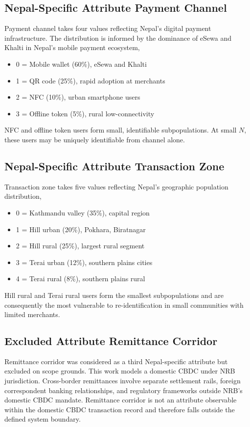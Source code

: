 \subsection{Nepal-Specific Attribute Payment Channel}
Payment channel takes four values reflecting Nepal's digital
payment infrastructure. The distribution is informed by the
dominance of eSewa and Khalti in Nepal's mobile payment
ecosystem,

\begin{itemize}
    \item 0 = Mobile wallet (60\%), eSewa and Khalti
    \item 1 = QR code (25\%), rapid adoption at merchants
    \item 2 = NFC (10\%), urban smartphone users
    \item 3 = Offline token (5\%), rural low-connectivity
\end{itemize}

NFC and offline token users form small, identifiable
subpopulations. At small $N$, these users may be uniquely
identifiable from channel alone.

\subsection{Nepal-Specific Attribute Transaction Zone}
Transaction zone takes five values reflecting Nepal's
geographic population distribution,

\begin{itemize}
    \item 0 = Kathmandu valley (35\%), capital region
    \item 1 = Hill urban (20\%), Pokhara, Biratnagar
    \item 2 = Hill rural (25\%), largest rural segment
    \item 3 = Terai urban (12\%), southern plains cities
    \item 4 = Terai rural (8\%), southern plains rural
\end{itemize}

Hill rural and Terai rural users form the smallest
subpopulations and are consequently the most vulnerable to
re-identification in small communities with limited merchants.

\subsection{Excluded Attribute Remittance Corridor}
Remittance corridor was considered as a third Nepal-specific
attribute but excluded on scope grounds. This work models
a domestic CBDC under NRB jurisdiction. Cross-border
remittances involve separate settlement rails, foreign
correspondent banking relationships, and regulatory
frameworks outside NRB's domestic CBDC mandate. Remittance
corridor is not an attribute observable within the domestic
CBDC transaction record and therefore falls outside the
defined system boundary.


